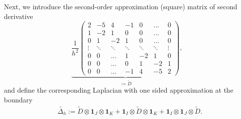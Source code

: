 \documentclass[12pt,reqno]{amsart}
\theoremstyle{definition}
\numberwithin{equation}{section}
\begin{document}
Next, we introduce the second-order approximation (square) matrix of second derivative 
$$
\underbrace{
	\frac{1}{h^2}
	\begin{pmatrix}
		2     & -5     & 4      & -1     & 0      & \dots  & 0      \\
		1     & -2     & 1      & 0      & 0      & \dots  & 0      \\
		0      & 1      & -2     & 1      & 0      & \dots  & 0      \\
		\vdots & \ddots & \ddots & \ddots & \ddots & \ddots & \vdots \\
		0      & 0      & \dots  & 1      & -2     & 1      & 0      \\
		0      & 0      & \dots  & 0      & 1      & -2    & 1      \\
		0      & 0      & \dots  & -1    & 4      & -5     & 2
\end{pmatrix}}_{:=\tilde{D}},
$$
and define the corresponding Laplacian with one sided approximation at the boundary
\begin{align}\label{eq:ext2}
	&
	\tilde{\Delta_h}:=
\tilde{D}\otimes \mathbf{1}_J\otimes \mathbf{1}_K
+ \mathbf{1}_I\otimes \tilde{D}\otimes \mathbf{1}_K  
+ \mathbf{1}_I\otimes \mathbf{1}_J\otimes \tilde{D}. 
\end{align}
\end{document}
